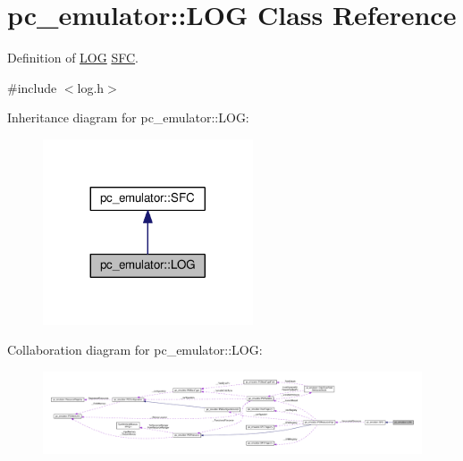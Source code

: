 \hypertarget{classpc__emulator_1_1LOG}{}\section{pc\+\_\+emulator\+:\+:L\+OG Class Reference}
\label{classpc__emulator_1_1LOG}


Definition of \hyperlink{classpc__emulator_1_1LOG}{L\+OG} \hyperlink{classpc__emulator_1_1SFC}{S\+FC}.  




{\ttfamily \#include $<$log.\+h$>$}



Inheritance diagram for pc\+\_\+emulator\+:\+:L\+OG\+:\nopagebreak
\begin{figure}[H]
\begin{center}
\leavevmode
\includegraphics[width=176pt]{classpc__emulator_1_1LOG__inherit__graph}
\end{center}
\end{figure}


Collaboration diagram for pc\+\_\+emulator\+:\+:L\+OG\+:\nopagebreak
\begin{figure}[H]
\begin{center}
\leavevmode
\includegraphics[width=350pt]{classpc__emulator_1_1LOG__coll__graph}
\end{center}
\end{figure}
